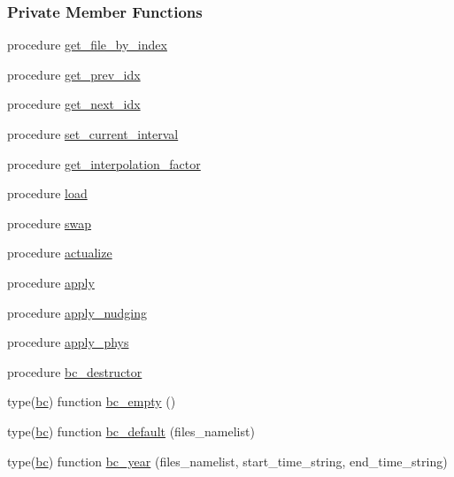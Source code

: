 \subsubsection*{Private Member Functions}
\begin{DoxyCompactItemize}
\item 
procedure \mbox{\hyperlink{structbc__mod_1_1bc_aad031a20982832747243dc3e3fbfce20}{get\+\_\+file\+\_\+by\+\_\+index}}
\item 
procedure \mbox{\hyperlink{structbc__mod_1_1bc_aa04b9a462194855b7c9111fe67456f0d}{get\+\_\+prev\+\_\+idx}}
\item 
procedure \mbox{\hyperlink{structbc__mod_1_1bc_abf0c1a16ec610ce08ed379315afc7f55}{get\+\_\+next\+\_\+idx}}
\item 
procedure \mbox{\hyperlink{structbc__mod_1_1bc_adf9262a425534bd18d98809381034ca1}{set\+\_\+current\+\_\+interval}}
\item 
procedure \mbox{\hyperlink{structbc__mod_1_1bc_a1d7f33a1fd0c18e5ce50af4690c82846}{get\+\_\+interpolation\+\_\+factor}}
\item 
procedure \mbox{\hyperlink{structbc__mod_1_1bc_a1c4ee986270f18f4400c4554c06c5f7b}{load}}
\item 
procedure \mbox{\hyperlink{structbc__mod_1_1bc_a925ae5960dbfc854eab908c52c13f719}{swap}}
\item 
procedure \mbox{\hyperlink{structbc__mod_1_1bc_a15503494f181d4090774d948cecdce48}{actualize}}
\item 
procedure \mbox{\hyperlink{structbc__mod_1_1bc_a628eafc79842d1d1d62e043aedf49aa0}{apply}}
\item 
procedure \mbox{\hyperlink{structbc__mod_1_1bc_a42dc448ba9e50fbb6b1acf03b0d121f3}{apply\+\_\+nudging}}
\item 
procedure \mbox{\hyperlink{structbc__mod_1_1bc_ad0d03ece320569369a296ff3d4cf10d2}{apply\+\_\+phys}}
\item 
procedure \mbox{\hyperlink{structbc__mod_1_1bc_ad38c12a9f905c66965ffe633ead4edd2}{bc\+\_\+destructor}}
\item 
type(\mbox{\hyperlink{structbc__mod_1_1bc}{bc}}) function \mbox{\hyperlink{structbc__mod_1_1bc_a721ce450ae1ffdc8c9f0c8ef12f045d1}{bc\+\_\+empty}} ()
\item 
type(\mbox{\hyperlink{structbc__mod_1_1bc}{bc}}) function \mbox{\hyperlink{structbc__mod_1_1bc_a740cece69077685b30af7e619d448b33}{bc\+\_\+default}} (files\+\_\+namelist)
\item 
type(\mbox{\hyperlink{structbc__mod_1_1bc}{bc}}) function \mbox{\hyperlink{structbc__mod_1_1bc_ad1e474e0627921dd48884966e30f379d}{bc\+\_\+year}} (files\+\_\+namelist, start\+\_\+time\+\_\+string, end\+\_\+time\+\_\+string)
\end{DoxyCompactItemize}
